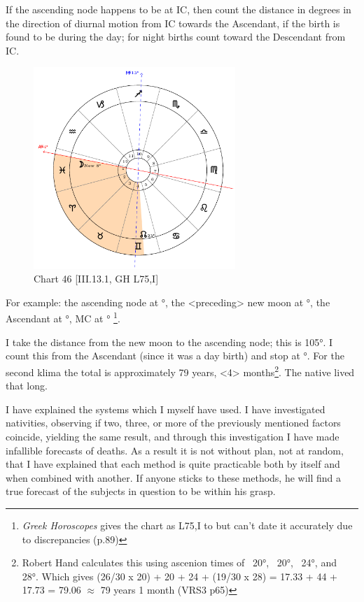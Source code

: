 If the ascending node happens to be at IC, then count the distance in degrees in the direction of diurnal motion
from IC towards the Ascendant, if the birth is found to be during the day; for night births count toward the Descendant from IC. 

\enlargethispage{2\baselineskip}
\clearpage
\begin{figure}
\centering
\includegraphics[width=0.68\textwidth]{charts/3_13_1}
\caption{Chart 46 [III.13.1, GH L75,I]}
\label{fig:chart46}
\end{figure}

For example: the ascending node at \Gemini\xspace 23°, the <preceding> new moon at \Pisces\xspace 8°, the Ascendant at \Pisces\xspace 4°, MC at \Sagittarius\xspace 13°
\footnote{\textit{Greek Horoscopes} gives the chart as L75,I to but can't date it accurately due to discrepancies (p.89)}. 

I take the distance from the new moon to the ascending node; this is 105°. I count this from the Ascendant (since it was a day birth) and stop at \Gemini\xspace 19°. For the second klima the total is approximately 79 years, <4> months\footnote{Robert Hand calculates this using ascenion times of \Pisces\, 20°, \Aries\, 20°, \Taurus\, 24°, and \Gemini\, 28°. Which gives (26/30 x 20) + 20 + 24 + (19/30 x 28) = 17.33 + 44 + 17.73 = 79.06 $\approx$ 79 years 1 month (VRS3 p65)}. The native lived that long.

I have explained the systems which I myself have used. I have investigated nativities, observing if two, three, or more of the previously mentioned factors coincide, yielding the same result, and through this investigation I have made infallible forecasts of deaths. As a result it is not without plan, not at random, that I have explained that each method is quite practicable both by itself and when combined with another. If anyone sticks to these methods, he will find a true forecast of the subjects in question to be within his grasp. 

